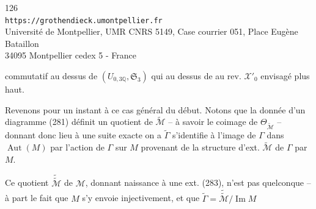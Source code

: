 

\begin{center}
\small
126\\
\texttt{https://grothendieck.umontpellier.fr}\\
Université de Montpellier, UMR CNRS 5149, Case courrier 051, Place Eugène Bataillon\\
34095 Montpellier cedex 5 - France
\end{center}

commutatif au dessus de $(U_{0,3\mathbb Q},\mathfrak S_3)$ qui au dessus de   au rev. $\mathcal X'_0$ envisagé plus haut.

Revenons pour un instant à ce cas général du début. Notons que la donnée d'un diagramme (281)  définit un quotient  de $\widetilde{\mathcal M}$ -- à savoir le coimage de $\Theta_{\widetilde{\mathcal M}}$ --   donnant donc lieu à une suite  exacte
 on a
$\widetilde\Gamma$ s'identifie à l'image de $\Gamma$ dans $\operatorname{Aut}(M)$ par l'action de $\Gamma$ sur $M$ provenant de la structure d'ext. $\widetilde{\mathcal M}$ de $\Gamma$ par $M$.

 Ce quotient $\widetilde{\widetilde{\mathcal M}}$ de $\mathcal M$, donnant naissance à une ext. (283), n'est pas quelconque -- à part le fait que $M$ s'y envoie injectivement, et que $\widetilde\Gamma=\widetilde{\widetilde{\mathcal M}}/\operatorname{Im}M$

